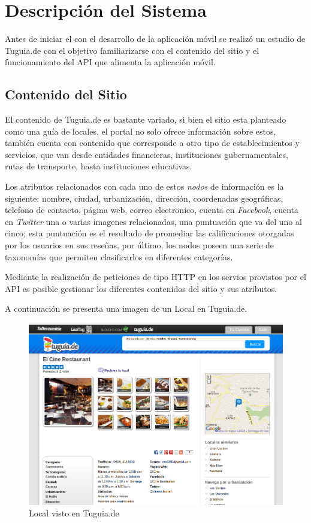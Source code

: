 \section{Descripción del Sistema} \label{subsect:descripcion}
Antes de iniciar el con el desarrollo de la aplicación móvil se realizó un estudio de Tuguia.de con el objetivo familiarizarse con el contenido del sitio y el funcionamiento del API que alimenta la aplicación móvil.

\subsection{Contenido del Sitio}
El contenido de Tuguia.de es bastante variado, si bien el sitio esta planteado como una guía de locales, el portal no solo ofrece información sobre estos, también cuenta con contenido que corresponde a otro tipo de establecimientos y servicios, que van desde entidades financieras, instituciones gubernamentales, rutas de transporte, hasta  instituciones educativas. 

Los atributos relacionados con cada uno de estos \textit{nodos} de información es la siguiente: nombre, ciudad, urbanización, dirección, coordenadas geográficas, telefono de contacto, página web, correo electronico, cuenta en \textit{Facebook}, cuenta en \textit{Twitter} una o varias imagenes relacionadas, una puntuación que va del uno al cinco; esta puntuación es el resultado de promediar las calificaciones otorgadas por los usuarios en sus reseñas, por último, los nodos poseen una serie de taxonomías que permiten clasificarlos en diferentes categorías. 

Mediante la realización de peticiones de tipo HTTP en los servios provistos por el API es posible gestionar los diferentes contenidos del sitio y sus atributos.

A continuación se presenta una imagen de un Local en Tuguia.de.

\begin{figure}[h]
	\begin{center}
		\includegraphics[scale=0.4]{imagenes/local_tgd.png}
	\end{center}
	\caption{
		\label{fig:localtgd}
		Local visto en Tuguia.de \cite{CTGD}
	}
\end{figure}


